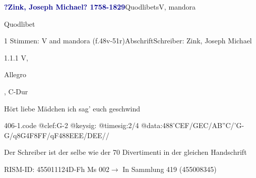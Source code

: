 \documentclass[twocolumn]{book}
\begin{document}
\par \vspace{7pt} \textcolor{darkblue}{\textbf{?Zink, Joseph Michael?  1758-1829}}\hfillplus{\textbf{[406]}}\newline Quodlibets\newline V, mandora
\par \begin{itshape}[heading, f.48v:] Quodlibet\end{itshape} 
\par \textcolor{darkblue}{}  1 Stimmen: V and mandora  (f.48v-51r)\newline Abschrift\newline Schreiber: Zink, Joseph Michael
\par 1.1.1  V, \begin{itshape}Allegro\end{itshape}, C-Dur\newline \begin{footnotesize} Hört liebe Mädchen ich sag' euch geschwind \end{footnotesize}  
\begin{filecontents*}{406-1.code}
@clef:G-2
@keysig:
@timesig:2/4
@data:488'CEF/GEC/AB''C/'G-G/q8G4F8FF/qF488EEE/DEE//
\end{filecontents*}
\newline
%
\par Der Schreiber ist der selbe wie der 70 Divertimenti in der gleichen Handschrift
\par RISM-ID: 455011124\newline D-Fh  Ms 002\newline $\rightarrow$ In Sammlung 419 (455008345)
      
\end{document}
